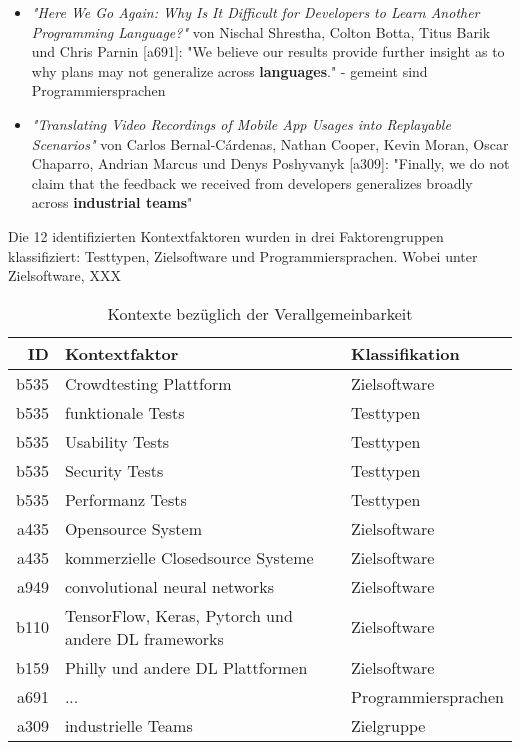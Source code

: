 \begin{itemize}
    \item \textit{"Here We Go Again: Why Is It Difficult for Developers to Learn Another Programming Language?"} von Nischal Shrestha, Colton Botta, Titus Barik und Chris Parnin [a691]: "We believe our results provide further insight as to why plans may not generalize across \textbf{languages}." - gemeint sind Programmiersprachen 
    \item \textit{"Translating Video Recordings of Mobile App Usages into Replayable Scenarios"} von Carlos Bernal-Cárdenas, Nathan Cooper, Kevin Moran, Oscar Chaparro, Andrian Marcus und Denys Poshyvanyk [a309]: "Finally, we do not claim that the feedback we received from developers generalizes broadly across \textbf{industrial teams}"
\end{itemize}

Die 12 identifizierten Kontextfaktoren wurden in drei Faktorengruppen klassifiziert: Testtypen, Zielsoftware und Programmiersprachen. Wobei unter Zielsoftware, XXX

\begin{table}[h!]
\begin{tabular}{ r | l | l  }
 ID & Kontextfaktor & Klassifikation \\ 
   \hline
 b535 & Crowdtesting Plattform & Zielsoftware\\
 b535 & funktionale Tests & Testtypen \\
 b535 & Usability Tests & Testtypen \\
 b535 & Security Tests & Testtypen \\
 b535 & Performanz Tests & Testtypen \\
 a435 & Opensource System & Zielsoftware \\
 a435 & kommerzielle Closedsource Systeme & Zielsoftware \\
 a949 & convolutional neural networks & Zielsoftware  \\
 b110 & TensorFlow, Keras, Pytorch und andere DL frameworks & Zielsoftware  \\
 b159 & Philly und andere DL Plattformen & Zielsoftware \\
 a691 & ... & Programmiersprachen \\
 a309 & industrielle Teams & Zielgruppe  \\
\end{tabular}
\caption{Kontexte bezüglich der Verallgemeinbarkeit}
\label{table:kontexte-verallgemeinbarkeit}
\end{table}

\clearpage

